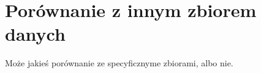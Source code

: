 
\section*{Porównanie z innym zbiorem danych}

Może jakieś porównanie ze specyficznyme zbiorami, albo nie.
